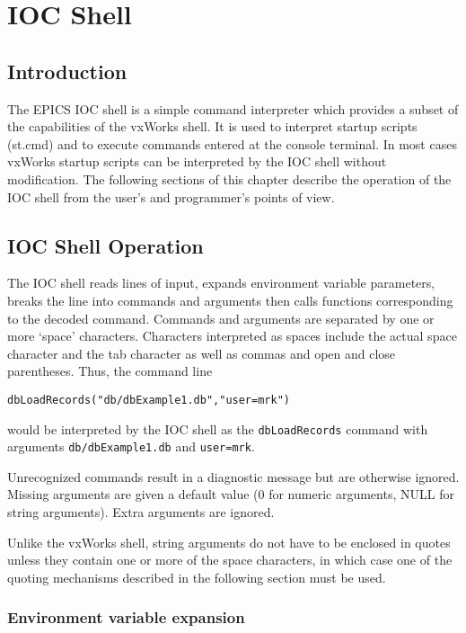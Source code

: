 \chapter{IOC Shell}
\section{Introduction}

The EPICS IOC shell is a simple command interpreter which provides a subset of the capabilities of the vxWorks shell.
It is used to interpret startup scripts (st.cmd) and to execute commands entered at the console terminal.
In most cases vxWorks startup scripts can be interpreted by the IOC shell without modification.
The following sections of this chapter describe the operation of the IOC shell from the user's and programmer's points of view.

\section{IOC Shell Operation}

The IOC shell reads lines of input, expands environment variable parameters, breaks the line into commands and arguments then calls functions corresponding to the decoded command.
Commands and arguments are separated by one or more `space' characters.
Characters interpreted as spaces include the actual space character and the tab character as well as commas and open and close parentheses.
Thus, the command line

\begin{verbatim}
dbLoadRecords("db/dbExample1.db","user=mrk")
\end{verbatim}

would be interpreted by the IOC shell as the \verb|dbLoadRecords| command with arguments \verb|db/dbExample1.db| and \verb|user=mrk|.

Unrecognized commands result in a diagnostic message but are otherwise ignored.
Missing arguments are given a default value (0 for numeric arguments, NULL for string arguments).
Extra arguments are ignored.

Unlike the vxWorks shell, string arguments do not have to be enclosed in quotes unless they contain one or more of the space characters, in which case one of the quoting mechanisms described in the following section must be used.

\subsection{Environment variable expansion}

